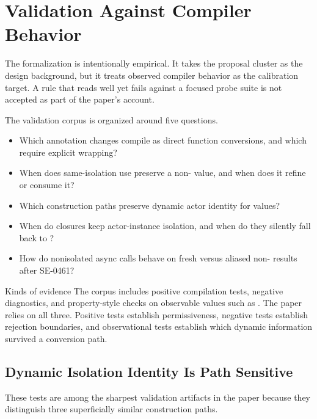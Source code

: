 \section{Validation Against Compiler Behavior}
\label{sec:validation}

The formalization is intentionally empirical. It takes the proposal cluster as the design background, but it treats observed compiler behavior as the calibration target. A rule that reads well yet fails against a focused probe suite is not accepted as part of the paper's account.

The validation corpus is organized around five questions.

\begin{itemize}
  \item Which annotation changes compile as direct function conversions, and which require explicit wrapping?
  \item When does same-isolation use preserve a non- value, and when does it refine or consume it?
  \item Which construction paths preserve dynamic actor identity for  values?
  \item When do closures keep actor-instance isolation, and when do they silently fall back to ?
  \item How do nonisolated async calls behave on fresh versus aliased non- results after SE-0461?
\end{itemize}

\begin{definitionbox}{Kinds of evidence}
The corpus includes positive compilation tests, negative diagnostics, and property-style checks on observable values such as . The paper relies on all three. Positive tests establish permissiveness, negative tests establish rejection boundaries, and observational tests establish which dynamic information survived a conversion path.
\end{definitionbox}

\subsection{Dynamic Isolation Identity Is Path Sensitive}


These tests are among the sharpest validation artifacts in the paper because they distinguish three superficially similar construction paths.

